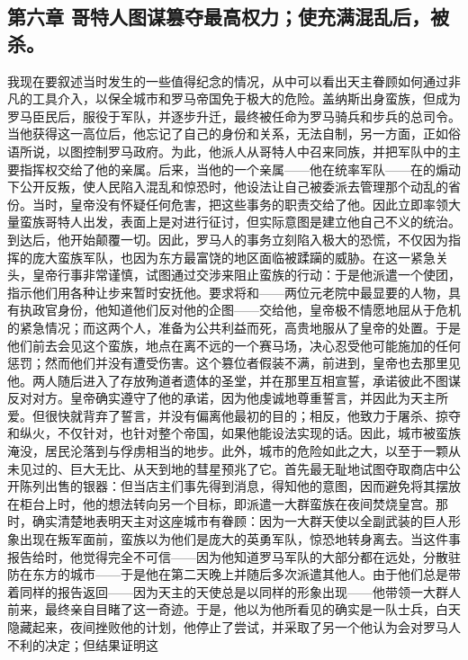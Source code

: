 
\subsection{第六章  哥特人图谋篡夺最高权力；使充满混乱后，被杀。}

我现在要叙述当时发生的一些值得纪念的情况，从中可以看出天主眷顾如何通过非凡的工具介入，以保全城市和罗马帝国免于极大的危险。盖纳斯出身蛮族，但成为罗马臣民后，服役于军队，并逐步升迁，最终被任命为罗马骑兵和步兵的总司令。当他获得这一高位后，他忘记了自己的身份和关系，无法自制，另一方面，正如俗语所说，以图控制罗马政府。为此，他派人从哥特人中召来同族，并把军队中的主要指挥权交给了他的亲属。后来，当他的一个亲属——他在统率军队——在的煽动下公开反叛，使人民陷入混乱和惊恐时，他设法让自己被委派去管理那个动乱的省份。当时，皇帝没有怀疑任何危害，把这些事务的职责交给了他。因此立即率领大量蛮族哥特人出发，表面上是对进行征讨，但实际意图是建立他自己不义的统治。到达后，他开始颠覆一切。因此，罗马人的事务立刻陷入极大的恐慌，不仅因为指挥的庞大蛮族军队，也因为东方最富饶的地区面临被蹂躏的威胁。在这一紧急关头，皇帝行事非常谨慎，试图通过交涉来阻止蛮族的行动：于是他派遣一个使团，指示他们用各种让步来暂时安抚他。要求将和——两位元老院中最显要的人物，具有执政官身份，他知道他们反对他的企图——交给他，皇帝极不情愿地屈从于危机的紧急情况；而这两个人，准备为公共利益而死，高贵地服从了皇帝的处置。于是他们前去会见这个蛮族，地点在离不远的一个赛马场，决心忍受他可能施加的任何惩罚；然而他们并没有遭受伤害。这个篡位者假装不满，前进到，皇帝也去那里见他。两人随后进入了存放殉道者遗体的圣堂，并在那里互相宣誓，承诺彼此不图谋反对对方。皇帝确实遵守了他的承诺，因为他虔诚地尊重誓言，并因此为天主所爱。但很快就背弃了誓言，并没有偏离他最初的目的；相反，他致力于屠杀、掠夺和纵火，不仅针对，也针对整个帝国，如果他能设法实现的话。因此，城市被蛮族淹没，居民沦落到与俘虏相当的地步。此外，城市的危险如此之大，以至于一颗从未见过的、巨大无比、从天到地的彗星预兆了它。首先最无耻地试图夺取商店中公开陈列出售的银器：但当店主们事先得到消息，得知他的意图，因而避免将其摆放在柜台上时，他的想法转向另一个目标，即派遣一大群蛮族在夜间焚烧皇宫。那时，确实清楚地表明天主对这座城市有眷顾：因为一大群天使以全副武装的巨人形象出现在叛军面前，蛮族以为他们是庞大的英勇军队，惊恐地转身离去。当这件事报告给时，他觉得完全不可信——因为他知道罗马军队的大部分都在远处，分散驻防在东方的城市——于是他在第二天晚上并随后多次派遣其他人。由于他们总是带着同样的报告返回——因为天主的天使总是以同样的形象出现——他带领一大群人前来，最终亲自目睹了这一奇迹。于是，他以为他所看见的确实是一队士兵，白天隐藏起来，夜间挫败他的计划，他停止了尝试，并采取了另一个他认为会对罗马人不利的决定；但结果证明这